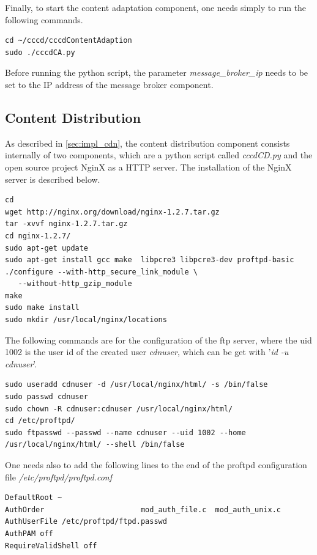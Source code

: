 Finally, to start the content adaptation component, one needs simply to run the following commands.

\begin{code}
\begin{verbatim}
cd ~/cccd/cccdContentAdaption
sudo ./cccdCA.py
\end{verbatim}
\end{code}

Before running the python script, the parameter \textit{message\_broker\_ip} needs to be set to the IP address of the message broker component.

\subsection{Content Distribution\label{sec:eval_te_cd}}
As described in \ref{sec:impl_cdn}, the content distribution component consists internally of two components, which are a python script called \textit{cccdCD.py} and the open source project NginX as a \ac{HTTP} server. The installation of the NginX server is described below.

\begin{code}
\begin{verbatim}
cd
wget http://nginx.org/download/nginx-1.2.7.tar.gz
tar -xvvf nginx-1.2.7.tar.gz 
cd nginx-1.2.7/
sudo apt-get update
sudo apt-get install gcc make  libpcre3 libpcre3-dev proftpd-basic
./configure --with-http_secure_link_module \
   --without-http_gzip_module
make
sudo make install
sudo mkdir /usr/local/nginx/locations
\end{verbatim}
\end{code}

The following commands are for the configuration of the ftp server, where the uid 1002 is the user id of the created user \textit{cdnuser}, which can be get with '\textit{id -u cdnuser}'.
\begin{code}
\begin{verbatim}
sudo useradd cdnuser -d /usr/local/nginx/html/ -s /bin/false
sudo passwd cdnuser
sudo chown -R cdnuser:cdnuser /usr/local/nginx/html/
cd /etc/proftpd/
sudo ftpasswd --passwd --name cdnuser --uid 1002 --home /usr/local/nginx/html/ --shell /bin/false
\end{verbatim}
\end{code}

One needs also to add the following lines to the end of the proftpd configuration file \textit{/etc/proftpd/proftpd.conf}
\begin{code}
\begin{verbatim}
DefaultRoot ~
AuthOrder                      mod_auth_file.c  mod_auth_unix.c
AuthUserFile /etc/proftpd/ftpd.passwd
AuthPAM off
RequireValidShell off
\end{verbatim}
\end{code}

